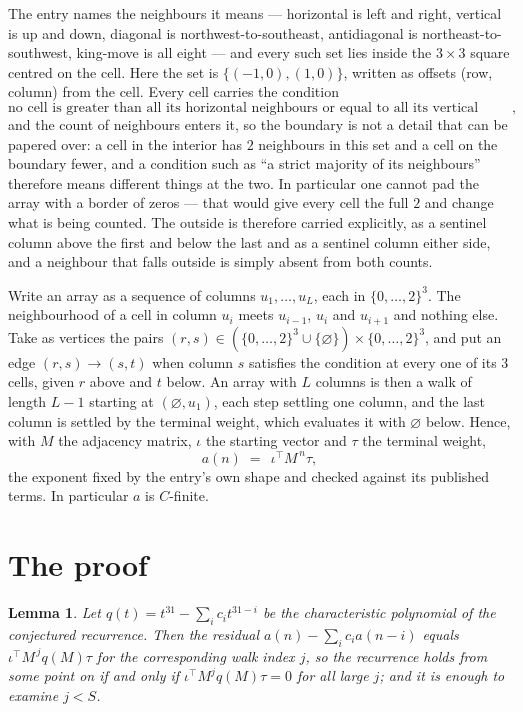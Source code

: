 \documentclass[11pt,a4paper]{article}
\theoremstyle{plain}
\newtheorem{lemma}[theorem]{Lemma}
\theoremstyle{definition}
\begin{document}
The entry names the neighbours it means --- horizontal is left and right, vertical is up and
down, diagonal is northwest-to-southeast, antidiagonal is northeast-to-southwest, king-move is
all eight --- and every such set lies inside the $3\times3$ square centred on the cell. Here
the set is $\{(-1,0), (1,0)\}$, written as offsets (row, column) from the cell. Every cell carries
the condition
\[
\text{no cell is greater than all its horizontal neighbours or equal to all its vertical neighbours},
\]
and the count of neighbours enters it, so the boundary is not a detail that can be papered
over: a cell in the interior has $2$ neighbours in this set and a cell on the boundary
fewer, and a condition such as ``a strict majority of its neighbours'' therefore means
different things at the two. In particular one cannot pad the array with a border of zeros ---
that would give every cell the full $2$ and change what is being counted. The outside is
therefore carried
explicitly, as a sentinel column above the first and below the last and as a sentinel column
either side, and a neighbour that falls outside is simply absent from both counts.

Write an array as a sequence of columns $u_1,\dots,u_L$, each in
$\{0,\dots,2\}^{3}$. The neighbourhood of a cell in column $u_i$ meets $u_{i-1}$,
$u_i$ and $u_{i+1}$ and nothing else. Take as vertices the pairs
$(r,s)\in(\{0,\dots,2\}^{3}\cup\{\varnothing\})\times\{0,\dots,2\}^{3}$,
and put an edge $(r,s)\to(s,t)$ when column $s$ satisfies the condition at every one of its
$3$ cells, given $r$ above and $t$ below. An array with $L$ columns is then a walk of length
$L-1$ starting at $(\varnothing,u_1)$, each step settling one column, and the last column is
settled by the terminal weight, which evaluates it with $\varnothing$ below. Hence,
with $M$ the adjacency matrix, $\iota$ the starting vector and $\tau$ the terminal weight,
\[
a(n)\;=\;\,\iota^{\!\top}M^{\,n}\tau ,
\]
the exponent fixed by the entry's own shape and checked against its published terms. In
particular $a$ is $C$-finite.

\section{The proof}

\begin{lemma}\label{lem:crit}
Let $q(t)=t^{31}-\sum_i c_it^{31-i}$ be the characteristic polynomial of the
conjectured recurrence. Then the residual $a(n)-\sum_ic_ia(n-i)$ equals
$\iota^{\!\top}M^{\,j}q(M)\tau$ for the corresponding walk index $j$, so the
recurrence holds from some point on if and only if $\iota^{\!\top}M^{j}q(M)\tau=0$ for all
large $j$; and it is enough to examine $j<S$.
\end{lemma}
\end{document}
